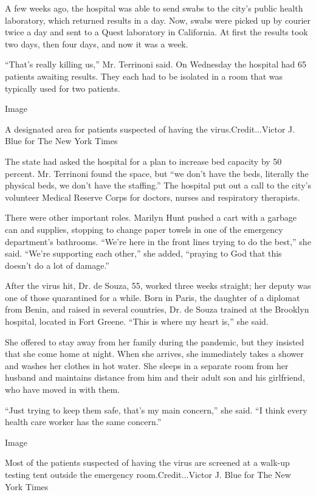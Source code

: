 A few weeks ago, the hospital was able to send swabs to the city's
public health laboratory, which returned results in a day. Now, swabs
were picked up by courier twice a day and sent to a Quest laboratory in
California. At first the results took two days, then four days, and now
it was a week.

``That's really killing us,'' Mr. Terrinoni said. On Wednesday the
hospital had 65 patients awaiting results. They each had to be isolated
in a room that was typically used for two patients.

Image

A designated area for patients suspected of having the
virus.Credit...Victor J. Blue for The New York Times

The state had asked the hospital for a plan to increase bed capacity by
50 percent. Mr. Terrinoni found the space, but ``we don't have the beds,
literally the physical beds, we don't have the staffing.'' The hospital
put out a call to the city's volunteer Medical Reserve Corps for
doctors, nurses and respiratory therapists.

There were other important roles. Marilyn Hunt pushed a cart with a
garbage can and supplies, stopping to change paper towels in one of the
emergency department's bathrooms. ``We're here in the front lines trying
to do the best,'' she said. ``We're supporting each other,'' she added,
``praying to God that this doesn't do a lot of damage.''

After the virus hit, Dr. de Souza, 55, worked three weeks straight; her
deputy was one of those quarantined for a while. Born in Paris, the
daughter of a diplomat from Benin, and raised in several countries, Dr.
de Souza trained at the Brooklyn hospital, located in Fort Greene.
``This is where my heart is,'' she said.

She offered to stay away from her family during the pandemic, but they
insisted that she come home at night. When she arrives, she immediately
takes a shower and washes her clothes in hot water. She sleeps in a
separate room from her husband and maintains distance from him and their
adult son and his girlfriend, who have moved in with them.

``Just trying to keep them safe, that's my main concern,'' she said. ``I
think every health care worker has the same concern.''

Image

Most of the patients suspected of having the virus are screened at a
walk-up testing tent outside the emergency room.Credit...Victor J. Blue
for The New York Times

